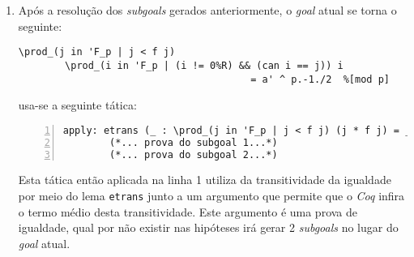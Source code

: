 \begin{enumerate}[label=\textbf{\roman*.}]
\begin{enumerate}
                Nesta subprova usa-se então o lema \lstinline[language=coq]|partition_big| com \lstinline[language=coq]|P i| sendo a condição $(i \neq 0)$, \lstinline[language=coq]|p| sendo a função $can$ e \lstinline[language=coq]|Q j| sendo a condição $(j < f(j))$. Após o uso de tal lema é então necessário provar mais um subgoal (que não é printado exatamente da seguinte forma mas é equivalente a tal): 
                \begin{lstlisting}[language=coq,frame=single,tabsize=1]
\forall i : 'F_p, i != 0%R -> can i < (a %% p * ((can i)^-1)%R) %% p
                \end{lstlisting}
                
        \end{enumerate}

        \item Após a resolução dos \textit{subgoals} gerados anteriormente, o \textit{goal} atual se torna o seguinte:
                \begin{lstlisting}[language=coq,frame=single,tabsize=1]
\prod_(j in 'F_p | j < f j) 
        \prod_(i in 'F_p | (i != 0%R) && (can i == j)) i
                                        = a' ^ p.-1./2  %[mod p]
                \end{lstlisting}
        usa-se a seguinte tática:
                \begin{lstlisting}[language=coq,frame=single, numbers=left,stepnumber=1,tabsize=1]
apply: etrans (_ : \prod_(j in 'F_p | j < f j) (j * f j) = _ %[mod p]).
        (*... prova do subgoal 1...*)
        (*... prova do subgoal 2...*)
                \end{lstlisting}
        Esta tática então aplicada na linha 1 utiliza da transitividade da igualdade por meio do lema \lstinline[language=coq]|etrans| junto a um argumento que permite que o \textit{Coq} infira o termo médio desta transitividade. Este argumento é uma prova de igualdade, qual por não existir nas hipóteses irá gerar 2 \textit{subgoals} no lugar do \textit{goal} atual.


\end{enumerate}
